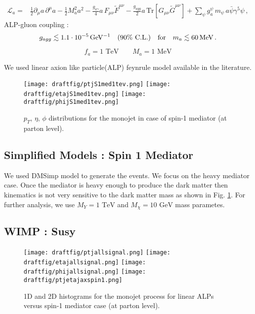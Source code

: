 \documentclass[aps,onecolumn,showpacs,superscriptaddress,groupedaddress,nofootinbib,preprint]{revtex4-1}
\newcommand{\cl}{\%\,\,  \text{C.L.}}
\begin{document}
\begin{align}\label{eqn:L_eff}
    \mathcal{L}_a = &\frac{1}{2}\partial_{\mu}a\,\partial^{\mu}a  - \frac{1}{2}M_{a}^2 a^2
                  -\frac{g_{a\gamma}}{4}a\,F_{\mu\nu}\tilde{F}^{\mu\nu} \nonumber 
                   - \frac{g_{agg}}{2}a\,\text{Tr}\left[G_{\mu\nu}\tilde{G}^{\mu\nu}\right] 
                  +\sum_{\psi}g^{\psi}_{a} \,m_\psi\,a\bar \psi \gamma^5 \psi\,,
\end{align}
ALP-gluon coupling \cite{Mimasu:2014nea,Brivio:2017ije} :
\[
g_{agg} \lesssim \unit[1.1\cdot10^{-5}]{GeV^{-1}} \quad (90\cl) \quad \text{for}\quad m_a \lesssim \unit[60]{MeV}\,.
\]

\[ f_a=1\,\, \mbox{TeV} \quad \quad  M_{a}=1\,\, \mbox{MeV}  \]

We used linear axion like particle(ALP) feynrule model available in the literature\cite{linearalps}. 

\begin{figure}
\centering
\texttt{[image: draftfig/ptjS1med1tev.png]}
\texttt{[image: draftfig/etajS1med1tev.png]}
\texttt{[image: draftfig/phijS1med1tev.png]}
\caption{$p_T$, $\eta$, $\phi$ distributions for the monojet  in case of  spin-1 mediator (at parton level)\label{spin1med}.}
\end{figure}




\subsection{Simplified Models : Spin 1 Mediator}
We used DMSimp\cite{} model to generate the events. We focus on the heavy mediator case. Once the mediator is heavy enough to produce the 
dark matter then kinematics is not very sensitive to the dark matter mass as shown in Fig. \ref{spin1med}. For further analysis, we use 
 $M_Y=1\,\, \mbox{TeV}$ and  $M_{\chi}=10\,\, \mbox{GeV}$ mass parametes.

\subsection{WIMP : Susy}



\begin{figure}
\centering
\texttt{[image: draftfig/ptjallsignal.png]}
\texttt{[image: draftfig/etajallsignal.png]}
\texttt{[image: draftfig/phijallsignal.png]}
\texttt{[image: draftfig/ptjetajaxspin1.png]}
\caption{1D and 2D histograms for the monojet process for linear ALPs versus spin-1 mediator case (at parton level).}
\end{figure}
\end{document}
